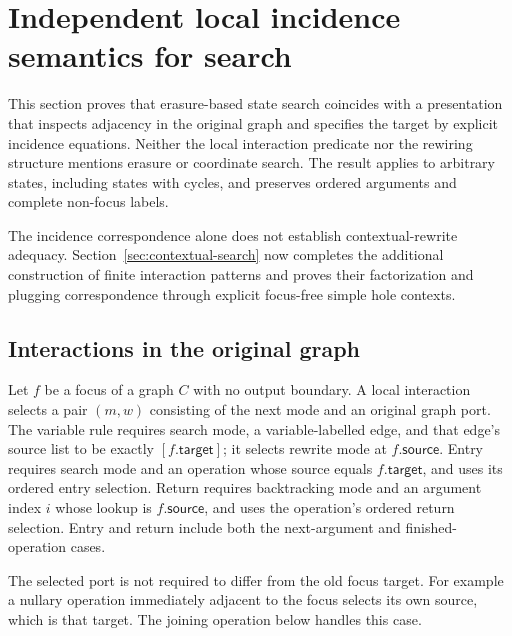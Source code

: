 \section{Independent local incidence semantics for search}
\label{sec:local-incidence}
This section proves that erasure-based state search coincides with a presentation
that inspects adjacency in the original graph and specifies the target by explicit
incidence equations. Neither the local interaction predicate nor the rewiring
structure mentions erasure or coordinate search. The result applies to arbitrary
states, including states with cycles, and preserves ordered arguments and complete
non-focus labels.

The incidence correspondence alone does not establish contextual-rewrite
adequacy. Section~\ref{sec:contextual-search} now completes the additional
construction of finite interaction patterns and proves their factorization
and plugging correspondence through explicit focus-free simple hole contexts.

\subsection{Interactions in the original graph}
\begin{definition}\label{term:local-interaction}
Let $f$ be a focus of a graph $C$ with no output boundary. A local interaction
selects a pair $(m,w)$ consisting of the next mode and an original graph port.
The variable rule requires search mode, a variable-labelled edge, and that
edge's source list to be exactly $[f.\mathsf{target}]$; it selects rewrite mode
at $f.\mathsf{source}$. Entry requires search mode and an operation whose
source equals $f.\mathsf{target}$, and uses its ordered entry selection.
Return requires backtracking mode and an argument index $i$ whose lookup is
$f.\mathsf{source}$, and uses the operation's ordered return selection.
Entry and return include both the next-argument and finished-operation cases.
\end{definition}
The selected port is not required to differ from the old focus target. For
example a nullary operation immediately adjacent to the focus selects its own
source, which is that target. The joining operation below handles this case.

